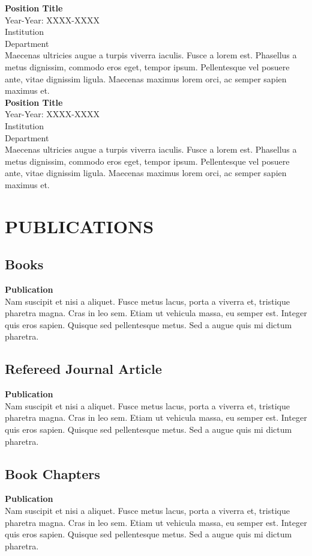 \documentclass[a4paper,9pt]{extarticle}
\begin{document}
\noindent
\textbf{Position Title} \\
Year-Year: XXXX-XXXX \\
Institution \\ 
Department \\
Maecenas ultricies augue a turpis viverra iaculis. Fusce a lorem est. Phasellus a metus dignissim, commodo eros eget, tempor ipsum. Pellentesque vel posuere ante, vitae dignissim ligula. Maecenas maximus lorem orci, ac semper sapien maximus et. \\

\noindent
\textbf{Position Title} \\
Year-Year: XXXX-XXXX \\
Institution \\ 
Department \\
Maecenas ultricies augue a turpis viverra iaculis. Fusce a lorem est. Phasellus a metus dignissim, commodo eros eget, tempor ipsum. Pellentesque vel posuere ante, vitae dignissim ligula. Maecenas maximus lorem orci, ac semper sapien maximus et. 


\section*{PUBLICATIONS}
 
\subsection*{Books}
\textbf{Publication} \\ 
Nam suscipit et nisi a aliquet. Fusce metus lacus, porta a viverra et, tristique pharetra magna. Cras in leo sem. Etiam ut vehicula massa, eu semper est. Integer quis eros sapien. Quisque sed pellentesque metus. Sed a augue quis mi dictum pharetra. 

\subsection*{Refereed Journal Article}
\textbf{Publication} \\ 
Nam suscipit et nisi a aliquet. Fusce metus lacus, porta a viverra et, tristique pharetra magna. Cras in leo sem. Etiam ut vehicula massa, eu semper est. Integer quis eros sapien. Quisque sed pellentesque metus. Sed a augue quis mi dictum pharetra. 

\subsection*{Book Chapters}
\textbf{Publication} \\ 
Nam suscipit et nisi a aliquet. Fusce metus lacus, porta a viverra et, tristique pharetra magna. Cras in leo sem. Etiam ut vehicula massa, eu semper est. Integer quis eros sapien. Quisque sed pellentesque metus. Sed a augue quis mi dictum pharetra. 
\end{document}
